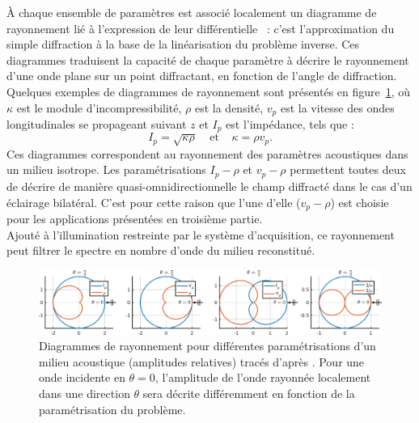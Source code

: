 À chaque ensemble de paramètres est associé localement un diagramme de rayonnement lié à l'expression de leur différentielle~\citep{forgues} : c'est l'approximation du simple diffraction à la base de la linéarisation du problème inverse. Ces diagrammes traduisent la capacité de chaque paramètre à décrire le rayonnement d'une onde plane sur un point diffractant, en fonction de l'angle de diffraction. Quelques exemples de diagrammes de rayonnement sont présentés en figure~\ref{rayonnement}, où $\kappa$ est le module d'incompressibilité, $\rho$ est la densité, $v_{p}$ est la vitesse des ondes longitudinales se propageant suivant $z$ et $I_{p}$ est l'impédance, tels que : 
\begin{equation*}
	I_{p}=\sqrt{\kappa \rho}~~~~~\text{et}~~~~~\kappa=\rho v_{p}\text{.}
\end{equation*}
Ces diagrammes correspondent au rayonnement des paramètres acoustiques dans un milieu isotrope. Les paramétrisations $I_{p}-\rho$ et $v_{p}-\rho$ permettent toutes deux de décrire de manière quasi-omnidirectionnelle le champ diffracté dans le cas d'un éclairage bilatéral. C'est pour cette raison que l'une d'elle ($v_{p}-\rho$) est choisie pour les applications présentées en troisième partie.\\%

Ajouté à l'illumination restreinte  par le système d'acquisition, ce rayonnement peut filtrer le spectre en nombre d'onde du milieu reconstitué. 


\begin{figure}[!h]
	\hspace{-1cm}\includegraphics[width=1.1\textwidth]{img/rayonnement.png}
	\caption{Diagrammes de rayonnement pour différentes paramétrisations d'un milieu acoustique (amplitudes relatives) tracés d'après \cite{forgues}. Pour une onde incidente en $\theta=0$, l'amplitude de l'onde rayonnée localement dans une direction $\theta$ sera décrite différemment en fonction de la paramétrisation du problème. \label{rayonnement}}
\end{figure}

